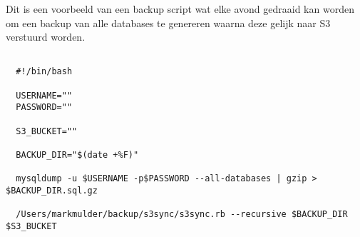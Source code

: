 Dit is een voorbeeld van een backup script wat elke avond gedraaid kan worden om een backup van alle databases te genereren waarna deze gelijk naar S3 verstuurd worden.

\begin{verbatim}
  
  #!/bin/bash
  
  USERNAME=""
  PASSWORD=""
  
  S3_BUCKET=""

  BACKUP_DIR="$(date +%F)"

  mysqldump -u $USERNAME -p$PASSWORD --all-databases | gzip > $BACKUP_DIR.sql.gz

  /Users/markmulder/backup/s3sync/s3sync.rb --recursive $BACKUP_DIR $S3_BUCKET
  
\end{verbatim}